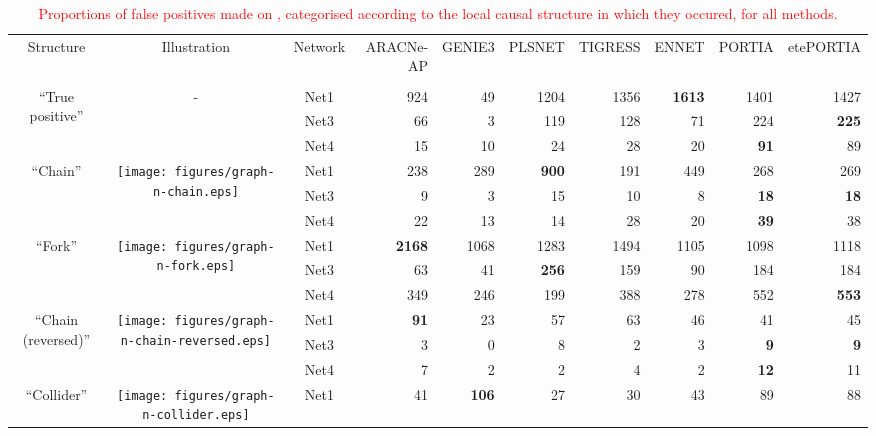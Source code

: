 \begin{table*}[t]
\caption{\textcolor{red}{Proportions of false positives made on \dreamfive, categorised according to the local causal structure in which they occured, for all methods.}\label{tab:fp-categories-dream5}}\begin{adjustbox}{max width=\textwidth}\color{red}\begin{tabular}{cccrrrrrrr} \\ \toprule
Structure & Illustration & Network & ARACNe-AP & GENIE3 & PLSNET & TIGRESS & ENNET & PORTIA & etePORTIA \\
          
 &  &  &  &  &  &  &  &  &  \\ \midrule
\multirow{3}{*}{``True positive''} & \multirow{3}{*}{-} & Net1 & 924 & 49 & 1204 & 1356 & \textbf{1613} & 1401 & 1427 \\
  &   & Net3 & 66 & 3 & 119 & 128 & 71 & 224 & \textbf{225} \\
  &   & Net4 & 15 & 10 & 24 & 28 & 20 & \textbf{91} & 89 \\
\midrule
\multirow{3}{*}{``Chain''} & \multirow{3}{*}{\texttt{[image: figures/graph-n-chain.eps]}} & Net1 & 238 & 289 & \textbf{900} & 191 & 449 & 268 & 269 \\
  &   & Net3 & 9 & 3 & 15 & 10 & 8 & \textbf{18} & \textbf{18} \\
  &   & Net4 & 22 & 13 & 14 & 28 & 20 & \textbf{39} & 38 \\
\midrule
\multirow{3}{*}{``Fork''} & \multirow{3}{*}{\texttt{[image: figures/graph-n-fork.eps]}} & Net1 & \textbf{2168} & 1068 & 1283 & 1494 & 1105 & 1098 & 1118 \\
  &   & Net3 & 63 & 41 & \textbf{256} & 159 & 90 & 184 & 184 \\
  &   & Net4 & 349 & 246 & 199 & 388 & 278 & 552 & \textbf{553} \\
\midrule
\multirow{3}{*}{``Chain (reversed)''} & \multirow{3}{*}{\texttt{[image: figures/graph-n-chain-reversed.eps]}} & Net1 & \textbf{91} & 23 & 57 & 63 & 46 & 41 & 45 \\
  &   & Net3 & 3 & 0 & 8 & 2 & 3 & \textbf{9} & \textbf{9} \\
  &   & Net4 & 7 & 2 & 2 & 4 & 2 & \textbf{12} & 11 \\
\midrule
\multirow{3}{*}{``Collider''} & \multirow{3}{*}{\texttt{[image: figures/graph-n-collider.eps]}} & Net1 & 41 & \textbf{106} & 27 & 30 & 43 & 89 & 88 \\

\end{tabular}
\end{adjustbox}
\end{table*}
